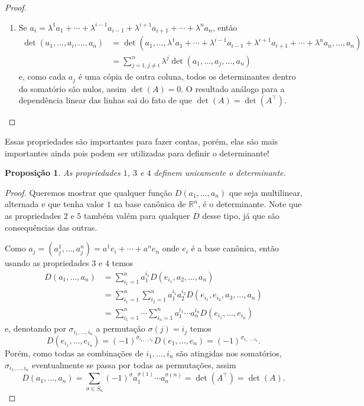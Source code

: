 \documentclass{article}
\newtheorem{proposition}[definition]{Proposição}
\begin{document}
\begin{proof}
\begin{enumerate}
        \item Se $a_i = \lambda^1 a_1 + \cdots + \lambda^{i-1}a_{i-1} + \lambda^{i+1}a_{i+1} + \cdots + \lambda^n a_n$, então \begin{align}
            \det(a_1, \dots, a_i, \dots, a_n) &= \det(a_1, \dots, \lambda^1 a_1 + \cdots + \lambda^{i-1}a_{i-1} + \lambda^{i+1}a_{i+1} + \cdots + \lambda^n a_n, \dots, a_n) \\ &= \sum_{j = 1, j \neq i}^n \lambda^j \det(a_1, \dots, a_j, \dots, a_n)
        \end{align} e, como cada $a_j$ é uma cópia de outra coluna, todos os determinantes dentro do somatório são nulos, assim $\det(A) = 0$. O resultado análogo para a dependência linear das linhas sai do fato de que $\det(A) = \det(A^\top)$.
    \end{enumerate}
\end{proof}

Essas propriedades são importantes para fazer contas, porém, elas são mais importantes ainda pois podem ser utilizadas para definir o determinante!

\begin{proposition}
    As propriedades $1$, $3$ e $4$ definem unicamente o determinante.
\end{proposition}
\begin{proof}
    Queremos mostrar que qualquer função $D(a_1, \dots, a_n)$ que seja multilinear, alternada e que tenha valor $1$ na base canônica de $\mathbb{R}^n$, é o determinante. Note que as propriedades $2$ e $5$ também valém para qualquer $D$ desse tipo, já que são consequências das outras.

    Como $a_j = (a^1_j, \dots, a^n_j) = a^1e_i + \cdots + a^ne_n$ onde $e_i$ é a base canônica, então usando as propriedades $3$ e $4$ temos \begin{align}
        D(a_1, \dots, a_n) &= \sum_{i_1 = 1}^n a^{i_1}_1 D(e_{i_1}, a_2, \dots, a_n) \\ &= \sum_{i_1 = 1}^n \sum_{i_2 = 1}^n a^{i_1}_1 a^{i_2}_2 D(e_{i_1}, e_{i_2}, a_3, \dots, a_n) \\ &= \sum_{i_1 = 1}^n \cdots \sum_{i_n = 1}^n a^{i_1}_1 \cdots a^{i_n}_n D(e_{i_1}, \dots, e_{i_n})
    \end{align} e, denotando por $\sigma_{i_1, \dots, i_n}$ a permutação $\sigma(j) = i_j$ temos \begin{equation}
        D(e_{i_1}, \dots, e_{i_n}) = (-1)^{\sigma_{i_1, \dots, i_n}} D(e_1, \dots, e_n) = (-1)^{\sigma_{i_1, \dots, i_n}}.
    \end{equation} Porém, como todas as combinações de $i_1, \dots, i_n$ são atingidas nos somatórios, $\sigma_{i_1, \dots, i_n}$ eventualmente se passa por todas as permutações, assim \begin{equation}
        D(a_1, \dots, a_n) = \sum_{\sigma \in S_n} (-1)^\sigma a^{\sigma(1)}_1 \cdots a^{\sigma(n)}_n = \det(A^\top) = \det(A).
    \end{equation}
\end{proof}
\end{document}
